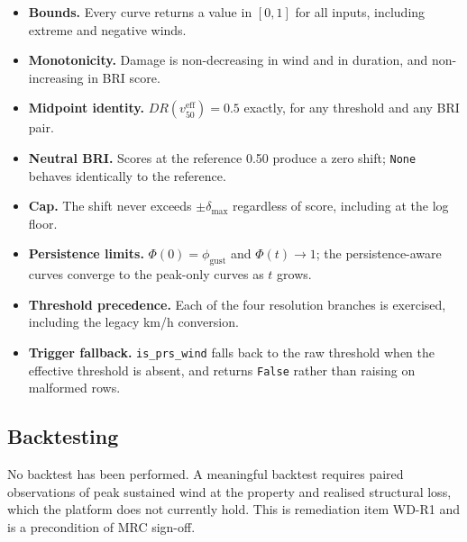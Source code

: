 \documentclass[11pt,a4paper]{article}
\begin{document}
\begin{itemize}
  \item \textbf{Bounds.} Every curve returns a value in $[0, 1]$ for all inputs,
        including extreme and negative winds.
  \item \textbf{Monotonicity.} Damage is non-decreasing in wind and in duration,
        and non-increasing in BRI score.
  \item \textbf{Midpoint identity.} $DR(v_{50}^{\text{eff}}) = 0.5$ exactly,
        for any threshold and any BRI pair.
  \item \textbf{Neutral BRI.} Scores at the reference 0.50 produce a zero shift;
        \texttt{None} behaves identically to the reference.
  \item \textbf{Cap.} The shift never exceeds $\pm\delta_{\max}$ regardless of
        score, including at the log floor.
  \item \textbf{Persistence limits.} $\Phi(0) = \phi_{\text{gust}}$ and
        $\Phi(t) \to 1$; the persistence-aware curves converge to the peak-only
        curves as $t$ grows.
  \item \textbf{Threshold precedence.} Each of the four resolution branches is
        exercised, including the legacy km/h conversion.
  \item \textbf{Trigger fallback.} \texttt{is\_prs\_wind} falls back to the raw
        threshold when the effective threshold is absent, and returns
        \texttt{False} rather than raising on malformed rows.
\end{itemize}

\subsection{Backtesting}
No backtest has been performed. A meaningful backtest requires paired
observations of peak sustained wind at the property and realised structural
loss, which the platform does not currently hold. This is remediation item
WD-R1 and is a precondition of MRC sign-off.

\mkmtestresults

\mkmlimitations
\label{sec:limitations}
\end{document}
